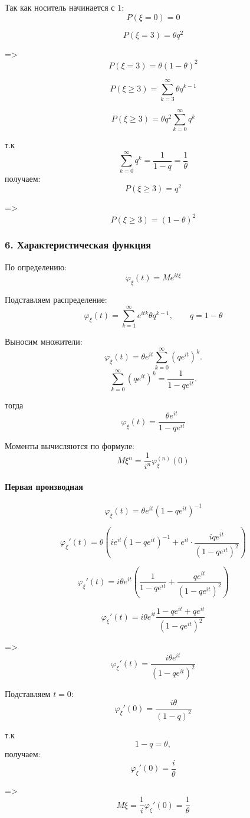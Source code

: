 \documentclass[12pt,a4paper]{article}
\theoremstyle{definition}
\begin{document}
Так как носитель начинается с $1$:
\[\boxed{P(\xi=0)=0}\]

\[P(\xi=3)=\theta q^2\]

=>
\[\boxed{P(\xi=3)=\theta(1-\theta)^2}\]

\[P(\xi\ge3)=\sum_{k=3}^{\infty}\theta q^{k-1}\]

\[P(\xi\ge3)=\theta q^2\sum_{k=0}^{\infty}q^k\]

т.к
\[\sum_{k=0}^{\infty}q^k=\frac1{1-q}=\frac1{\theta}\]
получаем:
\[P(\xi\ge3)=q^2\]

=>
\[\boxed{P(\xi\ge3)=(1-\theta)^2}\]

\subsubsection*{6. Характеристическая функция}

По определению:
\[\varphi_\xi(t)=Me^{it\xi}\]

Подставляем распределение:
\[\varphi_\xi(t)=
\sum_{k=1}^{\infty}
e^{itk}\theta q^{k-1},
\qquad q=1-\theta
\]

Выносим множители:
\[
\varphi_\xi(t)=\theta e^{it}
\sum_{k=0}^{\infty}(qe^{it})^k.
\]
\[\sum_{k=0}^{\infty}(qe^{it})^k=\frac1{1-qe^{it}}.\]

тогда
\[\boxed{\varphi_\xi(t)=\frac{\theta e^{it}}{1-qe^{it}}}\]

Моменты вычисляются по формуле:
\[M\xi^n=\frac1{i^n}\varphi_\xi^{(n)}(0)\]

\paragraph{Первая производная}

\[\varphi_\xi(t)=\theta e^{it}(1-qe^{it})^{-1}\]

\[\varphi_\xi'(t)=\theta\left(
ie^{it}(1-qe^{it})^{-1}
+
e^{it}\cdot
\frac{iqe^{it}}{(1-qe^{it})^2}
\right)\]

\[\varphi_\xi'(t)=
i\theta e^{it}\left(\frac1{1-qe^{it}}
+
\frac{qe^{it}}{(1-qe^{it})^2}
\right)\]

\[\varphi_\xi'(t)=i\theta e^{it}\frac{
1-qe^{it}+qe^{it}
}{
(1-qe^{it})^2
}\]

=>
\[\varphi_\xi'(t)=\frac{i\theta e^{it}}{(1-qe^{it})^2}\]

Подставляем $t=0$:
\[\varphi_\xi'(0)=\frac{i\theta}{(1-q)^2}\]

т.к
\[1-q=\theta,\]
получаем:
\[\varphi_\xi'(0)=\frac{i}{\theta}\]

=>
\[M\xi=\frac1{i}\varphi_\xi'(0)=\frac1{\theta}\]
\end{document}
